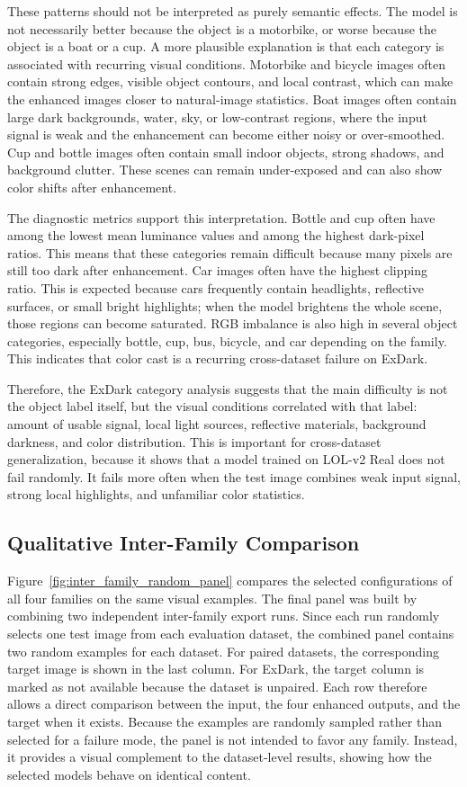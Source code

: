 These patterns should not be interpreted as purely semantic effects. The model is not necessarily better because the object is a motorbike, or worse because the object is a boat or a cup. A more plausible explanation is that each category is associated with recurring visual conditions. Motorbike and bicycle images often contain strong edges, visible object contours, and local contrast, which can make the enhanced images closer to natural-image statistics. Boat images often contain large dark backgrounds, water, sky, or low-contrast regions, where the input signal is weak and the enhancement can become either noisy or over-smoothed. Cup and bottle images often contain small indoor objects, strong shadows, and background clutter. These scenes can remain under-exposed and can also show color shifts after enhancement.

The diagnostic metrics support this interpretation. Bottle and cup often have among the lowest mean luminance values and among the highest dark-pixel ratios. This means that these categories remain difficult because many pixels are still too dark after enhancement. Car images often have the highest clipping ratio. This is expected because cars frequently contain headlights, reflective surfaces, or small bright highlights; when the model brightens the whole scene, those regions can become saturated. RGB imbalance is also high in several object categories, especially bottle, cup, bus, bicycle, and car depending on the family. This indicates that color cast is a recurring cross-dataset failure on ExDark.

Therefore, the ExDark category analysis suggests that the main difficulty is not the object label itself, but the visual conditions correlated with that label: amount of usable signal, local light sources, reflective materials, background darkness, and color distribution. This is important for cross-dataset generalization, because it shows that a model trained on LOL-v2 Real does not fail randomly. It fails more often when the test image combines weak input signal, strong local highlights, and unfamiliar color statistics.

\subsection{Qualitative Inter-Family Comparison}

Figure~\ref{fig:inter_family_random_panel} compares the selected configurations of all four families on the same visual examples. The final panel was built by combining two independent inter-family export runs. Since each run randomly selects one test image from each evaluation dataset, the combined panel contains two random examples for each dataset. For paired datasets, the corresponding target image is shown in the last column. For ExDark, the target column is marked as not available because the dataset is unpaired. Each row therefore allows a direct comparison between the input, the four enhanced outputs, and the target when it exists. Because the examples are randomly sampled rather than selected for a failure mode, the panel is not intended to favor any family. Instead, it provides a visual complement to the dataset-level results, showing how the selected models behave on identical content.

